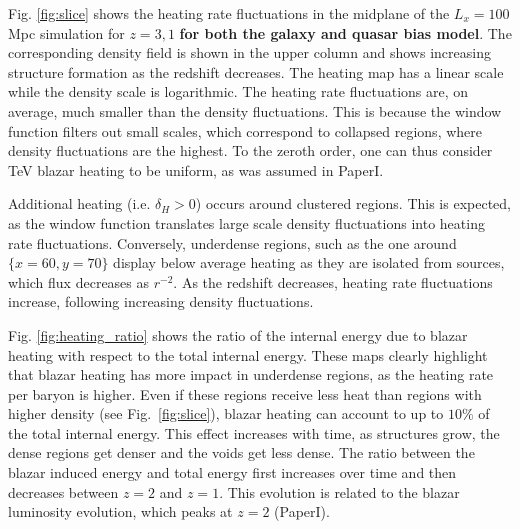 \documentclass[twocolumns]{emulateapj}
\newcommand\ALc[1]{{\color{red} \bf #1}} %
\begin{document}
Fig. \ref{fig:slice} shows the heating rate fluctuations in the midplane of the $L_x=100$ Mpc simulation for $z=3,1$ \ALc{for both the galaxy and quasar bias model}.  The corresponding density field is shown in the upper column and shows increasing structure formation as the redshift decreases.  The heating map has a linear scale while the density scale is logarithmic. The heating rate fluctuations are, on average, much smaller than the density fluctuations. This is because the window function filters out small scales, which correspond to collapsed regions,  where density fluctuations are the highest. To the zeroth order, one can thus consider TeV blazar heating to be uniform, as was assumed in PaperI.



Additional heating (i.e. $\delta_H>0$) occurs around clustered regions. This is expected, as the window function translates large scale density fluctuations into heating rate fluctuations.  Conversely, underdense regions, such as the one around $\{x=60,y=70\}$ display below average heating as they are isolated from sources, which flux decreases as $r^{-2}$. As the redshift decreases, heating rate fluctuations increase, following increasing density fluctuations.

Fig. \ref{fig:heating_ratio} shows the ratio of the internal energy due to  blazar heating with respect to the total internal energy.  These maps clearly highlight that blazar heating has more impact in underdense regions, as the heating rate per baryon is higher. Even if these regions receive less heat than regions with higher density (see Fig.~\ref{fig:slice}), blazar heating can account to up to $10\%$ of the total internal energy.  This effect increases with time, as structures grow, the dense regions get denser and the voids get less dense. The ratio between the blazar induced energy and total energy first increases over time and then decreases between $z=2$ and $z=1$.  This evolution is related to the blazar luminosity evolution, which peaks at $z=2$ (PaperI).
\end{document}
